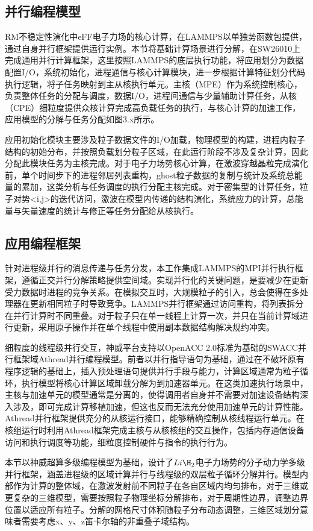 \subsection{并行编程模型}
RM不稳定性演化中eFF电子力场的核心计算，在LAMMPS以单独势函数包提供，通过自身并行框架提供运行实例。本节将基础计算场景进行分解，在SW26010上完成通用并行计算框架，这里按照LAMMPS的底层执行功能，将应用划分为数据配置I/O，系统初始化，进程通信与核心计算模块，进一步根据计算特征划分代码执行逻辑，将子任务映射到主从核执行单元。主核（MPE）作为系统控制核心，负责整体任务的分配与调度，数据I/O，进程间通信与少量辅助计算任务，从核（CPE）细粒度提供众核计算完成高负载任务的执行，与核心计算的加速工作，应用模型的分解与任务分配如图3.x所示。

应用初始化模块主要涉及粒子数据文件的I/O加载，物理模型的构建，进程内粒子结构的初始分布，并按照负载划分粒子区域，在此运行阶段不涉及复杂计算，因此分配此模块任务为主核完成。对于电子力场势核心计算，在激波穿越晶粒完成演化前，单个时间步下的进程邻居列表重构，ghost粒子数据的复制与统计及系统总能量的累加，这类分析与任务调度的执行分配主核完成。对于密集型的计算任务，粒子对势<i,j>的迭代访问，激波在模型内传递的结构演化，系统应力的计算，总能量与矢量速度的统计与修正等任务分配给从核执行。

\subsection{应用编程框架}
针对进程级并行的消息传递与任务分发，本工作集成LAMMPS的MPI并行执行框架，遵循正交并行分解策略提供空间域。实现并行化的关键问题，是要减少在更新受力数据时进程的竞争关系。在模拟交互时，大规模粒子的引入，总会使得在多处理器在更新相同粒子时导致竞争。LAMMPS并行框架通过访问重构，将列表拆分在并行计算时不同重叠。对于粒子只在单一线程上计算一次，并只在当前计算域进行更新，采用原子操作并在单个线程中使用副本数据结构解决规约冲突。

细粒度的线程级并行交互，神威平台支持以OpenACC 2.0标准为基础的SWACC并行框架域Athread并行编程模型。前者以并行指导语句为基础，通过在不破坏原有程序逻辑的基础上，插入预处理语句提供并行手段与能力，计算区域通常为粒子循环，执行模型将核心计算区域卸载分解为到加速器单元。在这类加速执行场景中， 主核与加速单元的模型通常是分离的，使得调用者自身并不需要对加速设备结构深入涉及，即可完成计算移植加速，但这也反而无法充分使用加速单元的计算性能。Athread并行框架提供充分的从核运行接口，能够精确控制从核线程运行单元。在核组运行时利用Athread框架完成主核与从核核组的交互操作，包括内存通信设备访问和执行调度等功能，细粒度控制硬件与指令的执行行为。

本节以神威超算多级编程模型为基础，设计了$Li\H_2$电子力场势的分子动力学多级并行框架，涵盖进程级的区域计算并行与线程级的双层粒子循环分解并行。模型内部作为计算的整体域，在激波发射前不同粒子在各自区域内均匀排布，对于三维或更复杂的三维模型，需要按照粒子物理坐标分解排布，对于周期性边界，调整边界位置以适应所有粒子。分解的网格尺寸体积随粒子分布动态调整，三维区域划分意味者需要考虑x、y、z笛卡尔轴的非重叠子域结构。

